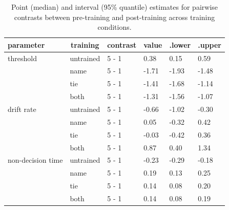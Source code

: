 \documentclass[
  english,
  man,floatsintext]{apa6}
\begin{document}
\begin{table}[tbp]

\begin{center}
\begin{threeparttable}

\caption{\label{tab:day-contrasts-lba-table}Point (median) and interval (95\% quantile) estimates for pairwise contrasts between pre-training and post-training across training conditions.}

\begin{tabular}{llllll}
\toprule
parameter & \multicolumn{1}{c}{training} & \multicolumn{1}{c}{contrast} & \multicolumn{1}{c}{value} & \multicolumn{1}{c}{.lower} & \multicolumn{1}{c}{.upper}\\
\midrule
threshold & untrained & 5 - 1 & 0.38 & 0.15 & 0.59\\
 & name & 5 - 1 & -1.71 & -1.93 & -1.48\\
 & tie & 5 - 1 & -1.41 & -1.68 & -1.14\\
 & both & 5 - 1 & -1.31 & -1.56 & -1.07\\
drift rate & untrained & 5 - 1 & -0.66 & -1.02 & -0.30\\
 & name & 5 - 1 & 0.05 & -0.32 & 0.42\\
 & tie & 5 - 1 & -0.03 & -0.42 & 0.36\\
 & both & 5 - 1 & 0.87 & 0.40 & 1.34\\
non-decision time & untrained & 5 - 1 & -0.23 & -0.29 & -0.18\\
 & name & 5 - 1 & 0.19 & 0.13 & 0.25\\
 & tie & 5 - 1 & 0.14 & 0.08 & 0.20\\
 & both & 5 - 1 & 0.14 & 0.08 & 0.19\\
\bottomrule
\end{tabular}

\end{threeparttable}
\end{center}

\end{table}
\end{document}
